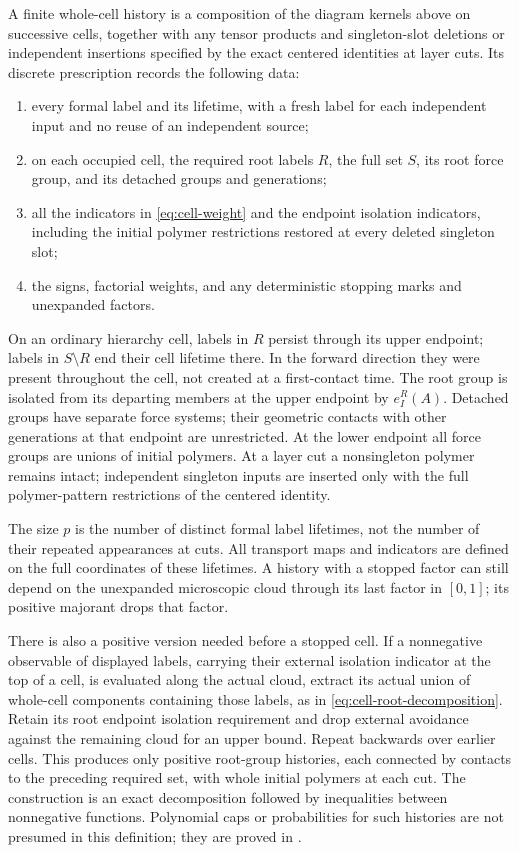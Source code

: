 \begin{definition}
\label{cell:histories}
A finite whole-cell history is a composition of the diagram kernels
above on successive cells, together with any tensor products and
singleton-slot deletions or independent insertions specified by
the exact centered identities at layer cuts.  Its discrete
prescription records the following data:
\begin{enumerate}
 \item every formal label and its lifetime, with a fresh label
 for each independent input and no reuse of an independent source;
 \item on each occupied cell, the required root labels $R$, the
 full set $S$, its root force group, and its detached groups and
 generations;
 \item all the indicators in \eqref{eq:cell-weight} and the
 endpoint isolation indicators, including the initial polymer
 restrictions restored at every deleted singleton slot;
 \item the signs, factorial weights, and any deterministic
 stopping marks and unexpanded factors.
\end{enumerate}
On an ordinary hierarchy cell, labels in $R$ persist through its upper endpoint;
labels in $S\setminus R$ end their cell lifetime there.  In the
forward direction they were present throughout the cell, not
created at a first-contact time.  The root group is isolated from
its departing members at the upper endpoint by $e_I^R(A)$.
Detached groups have separate force systems; their geometric
contacts with other generations at that endpoint are unrestricted.
At the lower endpoint all force groups are unions of initial
polymers.  At a layer cut a nonsingleton polymer remains intact;
independent singleton inputs are inserted only with the full
polymer-pattern restrictions of the centered identity.

The size $p$ is the number of distinct formal label lifetimes, not
the number of their repeated appearances at cuts.  All transport
maps and indicators are defined on the full coordinates of these
lifetimes.  A history with a stopped factor can still depend on
the unexpanded microscopic cloud through its last factor in
$[0,1]$; its positive majorant drops that factor.
\end{definition}

There is also a positive version needed before a stopped cell.  If a
nonnegative observable of displayed labels, carrying their external
isolation indicator at the top of a cell, is evaluated along the
actual cloud, extract its actual union of
whole-cell components containing those labels, as in
\eqref{eq:cell-root-decomposition}.  Retain its root endpoint
isolation requirement and drop external avoidance against the
remaining cloud for an upper bound.  Repeat backwards over earlier
cells.  This produces only positive root-group histories, each
connected by contacts to the preceding required set, with whole
initial polymers at each cut.  The construction is an exact
decomposition followed by inequalities between nonnegative
functions.  Polynomial caps or probabilities for such histories
are not presumed in this definition; they are proved in
.

